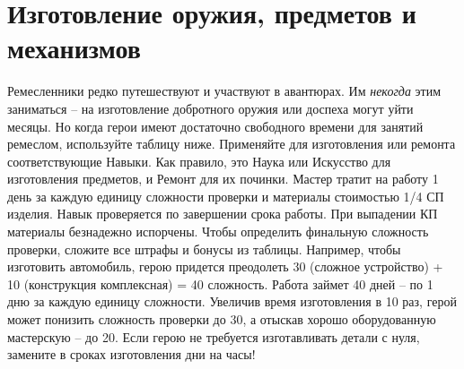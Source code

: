 \section{Изготовление оружия, предметов и механизмов}
Ремесленники редко путешествуют и участвуют в авантюрах. Им \textit{некогда} этим заниматься – на изготовление добротного оружия или доспеха могут уйти месяцы. Но когда герои имеют достаточно свободного времени для занятий ремеслом, используйте таблицу ниже. Применяйте для изготовления или ремонта соответствующие Навыки. Как правило, это Наука или Искусство для изготовления предметов, и Ремонт для их починки.
\newline Мастер тратит на работу 1 день за каждую единицу сложности проверки и материалы стоимостью 1/4 СП изделия. Навык проверяется по завершении срока работы. При выпадении КП материалы безнадежно испорчены. 
\newline Чтобы определить финальную сложность проверки, сложите все штрафы и бонусы из таблицы. Например, чтобы изготовить автомобиль, герою придется преодолеть 30 (сложное устройство) + 10 (конструкция комплексная) = 40 сложность. Работа займет 40 дней – по 1 дню за каждую единицу сложности. Увеличив время изготовления в 10 раз, герой может понизить сложность проверки до 30, а отыскав хорошо оборудованную мастерскую – до 20.
\newline Если герою не требуется изготавливать детали с нуля, замените в сроках изготовления дни на часы!

